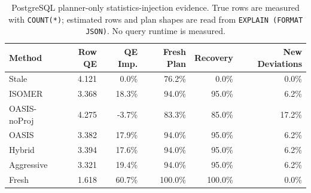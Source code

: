 \begin{table}[t]
  \centering
  \small
  \caption{PostgreSQL planner-only statistics-injection evidence. True rows are measured with \texttt{COUNT(*)}; estimated rows and plan shapes are read from \texttt{EXPLAIN (FORMAT JSON)}. No query runtime is measured.}
  \label{tab:postgres_planner_stats_injection}
  \setlength{\tabcolsep}{4pt}
  \begin{tabular}{lrrrrr}
    \toprule
    Method & Row QE & QE Imp. & Fresh Plan & Recovery & New Deviations \\
    \midrule
    Stale & 4.121 & 0.0\% & 76.2\% & 0.0\% & 0.0\% \\
    ISOMER & 3.368 & 18.3\% & 94.0\% & 95.0\% & 6.2\% \\
    OASIS-noProj & 4.275 & -3.7\% & 83.3\% & 85.0\% & 17.2\% \\
    OASIS & 3.382 & 17.9\% & 94.0\% & 95.0\% & 6.2\% \\
    Hybrid & 3.394 & 17.6\% & 94.0\% & 95.0\% & 6.2\% \\
    Aggressive & 3.321 & 19.4\% & 94.0\% & 95.0\% & 6.2\% \\
    Fresh & 1.618 & 60.7\% & 100.0\% & 100.0\% & 0.0\% \\
    \bottomrule
  \end{tabular}
\end{table}
